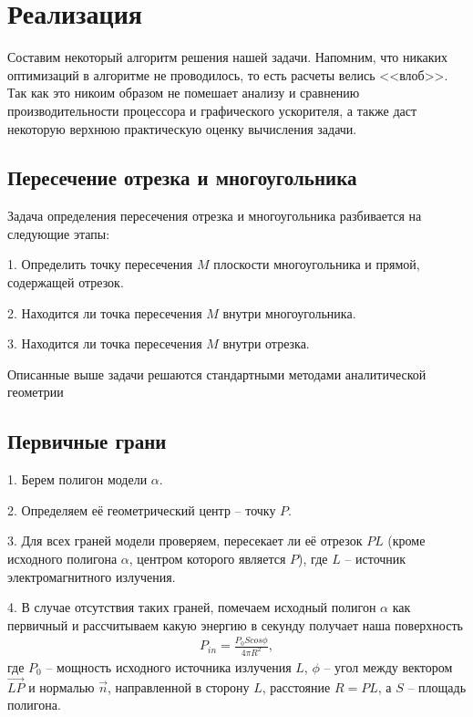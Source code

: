 \newpage
\section*{Реализация} 

Составим некоторый алгоритм решения нашей задачи. Напомним, что никаких оптимизаций в алгоритме не проводилось, то есть расчеты велись <<влоб>>. Так как это никоим образом не помешает анализу и сравнению производительности процессора и графического ускорителя, а также даст некоторую верхнюю практическую оценку вычисления задачи. 

\subsection*{Пересечение отрезка и многоугольника}

Задача определения пересечения отрезка и многоугольника разбивается на следующие этапы:

1. Определить точку пересечения $ M $ плоскости многоугольника и прямой, содержащей отрезок.

2. Находится ли точка пересечения $ M $ внутри многоугольника.

3. Находится ли точка пересечения $ M $ внутри отрезка.

Описанные выше задачи решаются стандартными методами аналитической геометрии \cite{geometry}

\subsection*{Первичные грани}

1. Берем полигон модели $\alpha$.

2. Определяем её геометрический центр -- точку $P$.

3. Для всех граней модели проверяем, пересекает ли её отрезок $PL$ (кроме исходного полигона $\alpha$, центром которого является $P$), где $L$ -- источник электромагнитного излучения.

4. В случае отсутствия таких граней, помечаем исходный полигон $\alpha$ как первичный и рассчитываем какую энергию в секунду получает наша поверхность
\begin{gather}
  P_{in} = \frac{P_0 S cos\phi}{4 \pi R^2},
\end{gather}
где $P_0$ -- мощность исходного источника излучения $L$, $\phi$ -- угол между вектором $\vec {LP}$ и нормалью $\vec n$, направленной в сторону $L$, расстояние $R = PL$, а $S$ -- площадь полигона.

